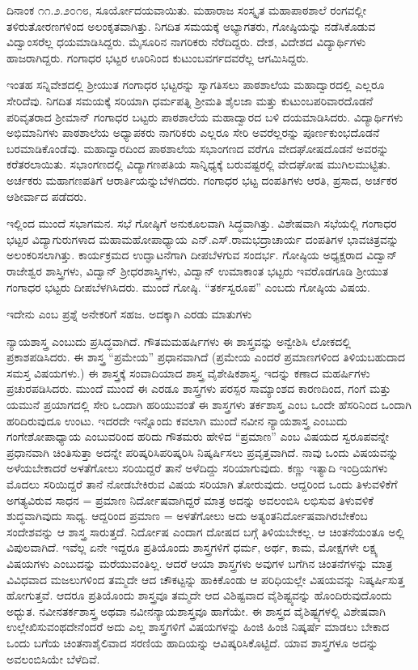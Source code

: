{ದಿನಾಂಕ ೧೧.೨.೨೦೧೮, ಸೂರ್ಯೋದಯವಾಯಿತು. ಮಹಾರಾಜ ಸಂಸ್ಕೃತ ಮಹಾಪಾಠಶಾಲೆ ರಂಗವಲ್ಲೀ ತಳಿರುತೋರಣಗಳಿಂದ ಅಲಂಕೃತವಾಗಿತ್ತು. ನಿಗದಿತ ಸಮಯಕ್ಕೆ ಅಭ್ಯಾಗತರು, ಗೋಷ್ಠಿಯನ್ನು ನಡೆಸಿಕೊಡುವ ವಿದ್ವಾಂಸರೆಲ್ಲ ಧಯಮಾಡಿಸಿದ್ದರು. ಮೈಸೂರಿನ ನಾಗರಿಕರು ನೆರೆದಿದ್ದರು. ದೇಶ, ವಿದೇಶದ ವಿದ್ಯಾರ್ಥಿಗಳು ಹಾಜರಾಗಿದ್ದರು. ಗಂಗಾಧರ ಭಟ್ಟರ ಊರಿನಿಂದ ಕುಟುಂಬವರ್ಗದವರೆಲ್ಲ ಆಗಮಿಸಿದ್ದರು. 

ಇಂತಹ ಸನ್ನಿವೇಶದಲ್ಲಿ ಶ್ರೀಯುತ ಗಂಗಾಧರ ಭಟ್ಟರನ್ನು ಸ್ವಾಗತಿಸಲು ಪಾಠ\-ಶಾಲೆಯ ಮಹಾದ್ವಾರದಲ್ಲಿ  ಎಲ್ಲರೂ ಸೇರಿದೆವು. ನಿಗದಿತ ಸಮಯಕ್ಕೆ ಸರಿಯಾಗಿ ಧರ್ಮಪತ್ನಿ ಶ್ರೀಮತಿ ಶೈಲಜಾ ಮತ್ತು ಕುಟುಂಬಪರಿವಾರದೊಡನೆ ಪರಿವೃತರಾದ ಶ್ರೀಮಾನ್ ಗಂಗಾಧರ ಬಟ್ಟರು ಪಾಠಶಾಲೆಯ ಮಹಾದ್ವಾರದ ಬಳಿ ದಯಮಾಡಿಸಿದರು. ವಿದ್ಯಾರ್ಥಿಗಳು ಅಭಿಮಾನಿಗಳು ಪಾಠಶಾಲೆಯ ಅಧ್ಯಾಪಕರು ನಾಗರಿಕರು ಎಲ್ಲರೂ ಸೇರಿ ಅವರೆಲ್ಲರನ್ನು ಪೂರ್ಣಕುಂಭದೊಡನೆ ಬರಮಾಡಿಕೊಂಡೆವು. ಮಹಾದ್ವಾರದಿಂದ ಪಾಠಶಾಲೆಯ ಸಭಾಂಗಣದ ವರೆಗೂ ವೇದಘೋಷದೊಡನೆ ಅವರನ್ನು ಕರೆತರಲಾಯಿತು. ಸಭಾಂಗಣದಲ್ಲಿ ವಿದ್ಯಾಗಣಪತಿಯ ಸಾನ್ನಿಧ್ಯಕ್ಕೆ ಬರುವಷ್ಟರಲ್ಲಿ ವೇದಘೋಷ ಮುಗಿಲಮುಟ್ಟಿತು. ಅರ್ಚಕರು  ಮಹಾಗಣಪತಿಗೆ ಆರಾರ್ತಿಯನ್ನು\break ಬೆಳಗಿದರು. ಗಂಗಾಧರ ಭಟ್ಟ ದಂಪತಿಗಳು ಆರತಿ, ಪ್ರಸಾದ, ಅರ್ಚಕರ ಆಶೀರ್ವಾದ ಪಡೆದರು.

ಇಲ್ಲಿಂದ ಮುಂದೆ ಸಭಾಗಮನ. ಸಭೆ ಗೋಷ್ಠಿಗೆ ಅನುಕೂಲವಾಗಿ ಸಿದ್ಧವಾಗಿತ್ತು. ವಿಶೇಷವಾಗಿ ಸಭೆಯಲ್ಲಿ ಗಂಗಾಧರ ಭಟ್ಟರ ವಿದ್ಯಾಗುರುಗಳಾದ ಮಹಾಮಹೋಪಾ\-ಧ್ಯಾಯ ಎನ್.ಎಸ್.ರಾಮಭದ್ರಾಚಾರ್ಯ ದಂಪತಿಗಳ ಭಾವಚಿತ್ರವನ್ನು ಅಲಂಕರಿಸಲಾಗಿತ್ತು.  ಕಾರ್ಯಕ್ರಮದ ಉದ್ಘಾಟನೆಗಾಗಿ ದೀಪಬೆಳಗುವ ಸಂದರ್ಭ. ಗೋಷ್ಠಿಯ ಅಧ್ಯಕ್ಷರಾದ ವಿದ್ವಾನ್ ರಾಜೇಶ್ವರ ಶಾಸ್ತ್ರಿಗಳು, ವಿದ್ವಾನ್ ಶ್ರೀಧರಶಾಸ್ತ್ರಿಗಳು, ವಿದ್ವಾನ್ ಉಮಾಕಾಂತ ಭಟ್ಟರು ಇವರೊಡಗೂಡಿ ಶ್ರೀಯುತ ಗಂಗಾಧರ ಭಟ್ಟರು ದೀಪಬೆಳಗಿ\-ಸಿದರು. ಮುಂದೆ ಗೋಷ್ಠಿ. “ತರ್ಕಸ್ವರೂಪ” ಎಂಬದು ಗೋಷ್ಠಿಯ ವಿಷಯ.

ಇದೇನು ಎಂಬ ಪ್ರಶ್ನೆ ಅನೇಕರಿಗೆ ಸಹಜ. ಅದಕ್ಕಾಗಿ  ಎರಡು ಮಾತುಗಳು \enginline{-}

ನ್ಯಾಯಶಾಸ್ತ್ರ ಎಂಬುದು ಪ್ರಸಿದ್ಧವಾಗಿದೆ. ಗೌತಮಮಹರ್ಷಿಗಳು ಈ ಶಾಸ್ತ್ರವನ್ನು ಅನ್ವೇಶಿಸಿ ಲೋಕದಲ್ಲಿ ಪ್ರಕಾಶಪಡಿಸಿದರು. ಈ ಶಾಸ್ತ್ರ “ಪ್ರಮೇಯ” ಪ್ರಧಾನವಾಗಿದೆ \enginline{-} (ಪ್ರಮೇಯ ಎಂದರೆ ಪ್ರಮಾಣಗಳಿಂದ ತಿಳಿಯಬಹುದಾದ ಸಮಸ್ತ ವಿಷಯಗಳು.) ಈ  ಶಾಸ್ತ್ರಕ್ಕೆ ಸಂವಾದಿಯಾದ ಶಾಸ್ತ್ರ ವೈಶೇಷಿಕಶಾಸ್ತ್ರ. ಇದನ್ನು ಕಣಾದ ಮಹರ್ಷಿಗಳು ಪ್ರಚುರಪಡಿಸಿದರು. ಮುಂದೆ ಮುಂದೆ ಈ ಎರಡೂ ಶಾಸ್ತ್ರಗಳು ಪರಸ್ಪರ ಸಾಮ್ಯಾಂಶದ ಕಾರಣದಿಂದ, ಗಂಗೆ ಮತ್ತು ಯಮುನೆ ಪ್ರಯಾಗದಲ್ಲಿ ಸೇರಿ ಒಂದಾಗಿ ಹರಿಯುವಂತೆ  ಈ ಶಾಸ್ತ್ರಗಳು ತರ್ಕಶಾಸ್ತ್ರ ಎಂಬ ಒಂದೇ ಹೆಸರಿನಿಂದ ಒಂದಾಗಿ ಹರಿದಿರುವುದೂ ಉಂಟು. ಇದರದೇ ಇನ್ನೊಂದು ಕವಲಾಗಿ ಮುಂದೆ ನವೀನ ನ್ಯಾಯಶಾಸ್ತ್ರ ಎಂಬುದು ಗಂಗೇಶೋಪಾಧ್ಯಾಯ ಎಂಬುವರಿಂದ ಹರಿದು ಗೌತಮರು ಹೇಳಿದ “ಪ್ರಮಾಣ” ಎಂಬ ವಿಷಯದ ಸ್ವರೂಪವನ್ನೇ ಪ್ರಧಾನವಾಗಿ ಚಿಂತಿಸುತ್ತಾ ಅದನ್ನೇ ಪರಿಷ್ಕರಿಸಿ\break ಪರಿಷ್ಕರಿಸಿ ನಿಷ್ಕರ್ಷಿಸಲು ಪ್ರವೃತ್ತವಾಗಿದೆ. ನಾವು ಒಂದು ವಿಷಯವನ್ನು ಅಳೆಯ\-ಬೇಕಾದರೆ ಅಳತೆಗೋಲು ಸರಿಯಿದ್ದರೆ ತಾನೆ ಅಳೆದಿದ್ದು ಸರಿಯಾಗುವುದು. ಕಣ್ಣು ಇತ್ಯಾದಿ ಇಂದ್ರಿಯಗಳು ಮೊದಲು ಸರಿಯಿದ್ದರೆ ತಾನೆ ನೋಡಬೇಕಿರುವ ವಿಷಯ ಸರಿಯಾಗಿ ತೋರುವುದು. ಆದ್ದರಿಂದ ಒಂದು ತಿಳುವಳಿಕೆಗೆ ಅಗತ್ಯವಿರುವ ಸಾಧನ = ಪ್ರಮಾಣ ನಿರ್ದೋಷವಾಗಿದ್ದರೆ ಮಾತ್ರ ಅದನ್ನು ಅವಲಂಬಿಸಿ ಲಭಿಸುವ ತಿಳುವಳಿಕೆ ಶುದ್ಧವಾಗಿವುದು ಸಾಧ್ಯ. ಆದ್ದರಿಂದ ಪ್ರಮಾಣ = ಅಳತೆಗೋಲು ಅದು ಅತ್ಯಂತ\break ನಿರ್ದೋಷವಾಗಿರಬೇಕೆಂಬ ಸಂದೇಶವನ್ನು ಆ ಶಾಸ್ತ್ರ ಸಾರುತ್ತದೆ. ನಿರ್ದೋಷ ಎಂದಾಗ ದೋಷದ ಬಗ್ಗೆ ತಿಳಿಯಬೇಕಲ್ಲ. ಆ ಚಿಂತನೆಯಂತೂ ಅಲ್ಲಿ ವಿಪುಲವಾಗಿದೆ. ಇವೆಲ್ಲ ಏನೇ ಇದ್ದರೂ ಪ್ರತಿಯೊಂದು ಶಾಸ್ತ್ರಗಳಿಗೆ ಧರ್ಮ, ಅರ್ಥ, ಕಾಮ, ಮೋಕ್ಷಗಳೇ ಲಕ್ಷ್ಯ ವಿಷಯಗಳು ಎಂಬುದನ್ನು ಮರೆಯುವಂತಿಲ್ಲ. ಆದರೆ ಆಯಾ ಶಾಸ್ತ್ರಗಳು ಅವುಗಳ ಬಗೆಗಿನ ಚಿಂತನೆಗಳನ್ನು ಮಾತ್ರ ವಿವಿಧವಾದ ಮಜಲುಗಳಿಂದ ತಮ್ಮದೇ ಆದ ಚೌಕಟ್ಟನ್ನು ಹಾಕಿಕೊಂಡು ಆ ಪರಿಧಿಯಲ್ಲೇ ವಿಷಯವನ್ನು ನಿಷ್ಕರ್ಷಿಸುತ್ತ ಹೋಗುತ್ತವೆ. ಆದರೂ ಪ್ರತಿಯೊಂದು ಶಾಸ್ತ್ರವೂ ತಮ್ಮದೇ ಆದ ವಿಶಿಷ್ಟವಾದ ವೈಶಿಷ್ಟ್ಯವನ್ನು ಹೊಂದಿರುವುದೊಂದು ಅಧ್ಭುತ. ನವೀನತರ್ಕಶಾಸ್ತ್ರ ಅಥವಾ ನವೀನನ್ಯಾಯಶಾಸ್ತ್ರವೂ ಹಾಗೆಯೇ. ಈ ಶಾಸ್ತ್ರದ ವೈಶಿಷ್ಟ್ಯಗಳಲ್ಲಿ ವಿಶೇಷವಾಗಿ ಉಲ್ಲೇಖಿಸುವಂಥದೇನೆಂದರೆ ಅದು ಎಲ್ಲ ಶಾಸ್ತ್ರಗಳಿಗೆ ವಿಷಯಗಳನ್ನು ಹಿಂಜಿ ಹಿಂಜಿ ನಿಷ್ಕರ್ಷೆ ಮಾಡಲು ಬೇಕಾದ ಒಂದು ಬಗೆಯ ಚಿಂತನಾಶೈಲಿ\enginline{-}ವಾದ ಸರಣಿಯ ಹಾದಿಯನ್ನು ಆವಿಷ್ಕರಿಸಿಕೊಟ್ಟಿದೆ. ಯಾವ ಶಾಸ್ತ್ರಗಳೂ ಅದನ್ನು ಅವಲಂಬಿಸಿಯೇ ಬೆಳೆದಿವೆ. 

}
